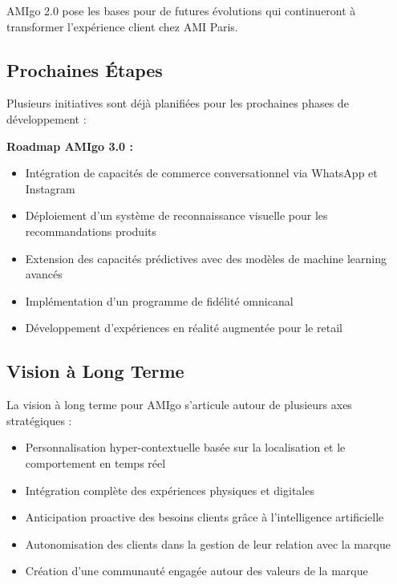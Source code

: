 AMIgo 2.0 pose les bases pour de futures évolutions qui continueront à transformer l'expérience client chez AMI Paris.

\subsection{Prochaines Étapes}

Plusieurs initiatives sont déjà planifiées pour les prochaines phases de développement :

\begin{mdframed}[backgroundcolor=lightblue, linewidth=0pt, innerleftmargin=10pt, innerrightmargin=10pt]
\textbf{Roadmap AMIgo 3.0 :}
\begin{itemize}
    \item Intégration de capacités de commerce conversationnel via WhatsApp et Instagram
    \item Déploiement d'un système de reconnaissance visuelle pour les recommandations produits
    \item Extension des capacités prédictives avec des modèles de machine learning avancés
    \item Implémentation d'un programme de fidélité omnicanal
    \item Développement d'expériences en réalité augmentée pour le retail
\end{itemize}
\end{mdframed}

\subsection{Vision à Long Terme}

La vision à long terme pour AMIgo s'articule autour de plusieurs axes stratégiques :

\begin{itemize}
    \item Personnalisation hyper-contextuelle basée sur la localisation et le comportement en temps réel
    \item Intégration complète des expériences physiques et digitales
    \item Anticipation proactive des besoins clients grâce à l'intelligence artificielle
    \item Autonomisation des clients dans la gestion de leur relation avec la marque
    \item Création d'une communauté engagée autour des valeurs de la marque
\end{itemize}


